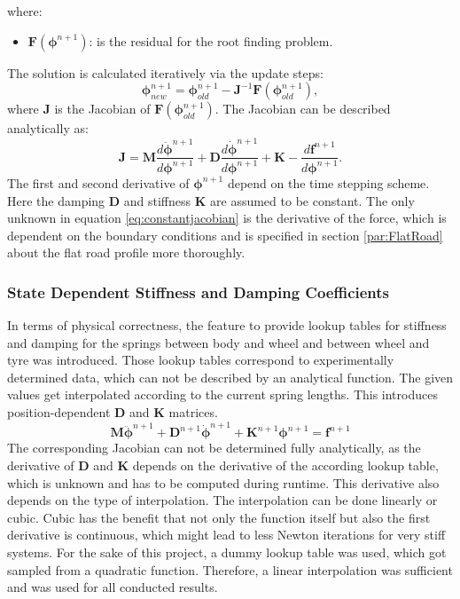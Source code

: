 where:
\begin{itemize}
    \item $\boldsymbol{F}(\boldsymbol{\phi}^{n+1})$: is the residual for the root finding problem.
\end{itemize}
The solution is calculated iteratively via the update steps:
\begin{equation}
\boldsymbol{\phi}^{n+1}_{new} = \boldsymbol{\phi}^{n+1}_{old} - \boldsymbol{J}^{-1}\boldsymbol{F}(\boldsymbol{\phi}^{n+1}_{old}),
\end{equation}
where $\boldsymbol{J}$ is the Jacobian of $\boldsymbol{F}(\boldsymbol{\phi}^{n+1}_{old})$. The Jacobian can be described analytically as:
\begin{equation}
    \label{eq:constantjacobian}
    \boldsymbol{J} = \boldsymbol{M} \frac{d \ddot{\boldsymbol{\phi}}^{n+1}}{d \boldsymbol{\phi}^{n+1}} +  \boldsymbol{D} \frac{d \dot{\boldsymbol{\phi}}^{n+1}}{d \boldsymbol{\phi}^{n+1}} + \boldsymbol{K}  - \frac{d \boldsymbol{f}^{n+1}}{d \boldsymbol{\phi}^{n+1}}.
\end{equation}
The first and second derivative of $\boldsymbol{\phi}^{n+1}$ depend on the time stepping scheme. Here the damping $\boldsymbol{D}$ and stiffness $\boldsymbol{K}$ are assumed to be constant. The only unknown in equation \eqref{eq:constantjacobian} is the derivative of the force, which is dependent on the boundary conditions and is specified in section \ref{par:FlatRoad} about the flat road profile more thoroughly.

\subsubsection{State Dependent Stiffness and Damping Coefficients}
In terms of physical correctness, the feature to provide lookup tables for stiffness and damping for the springs between body and wheel and between wheel and tyre was introduced. Those lookup tables correspond to experimentally determined data, which can not be described by an analytical function. The given values get interpolated according to the current spring lengths. This introduces position-dependent $\boldsymbol{D}$ and $\boldsymbol{K}$ matrices.
\begin{equation}
     \boldsymbol{M} \ddot{\boldsymbol{\phi}}^{n+1}+ \boldsymbol{D}^{n+1} \dot{\boldsymbol{\phi}}^{n+1} + \boldsymbol{K}^{n+1}\boldsymbol{\phi}^{n+1}=\boldsymbol{f}^{n+1}
\end{equation}
The corresponding Jacobian can not be determined fully analytically, as the derivative of $\boldsymbol{D}$ and $\boldsymbol{K}$ depends on the derivative of the according lookup table, which is unknown and has to be computed during runtime. This derivative also depends on the type of interpolation. The interpolation can be done linearly or cubic. Cubic has the benefit that not only the function itself but also the first derivative is continuous, which might lead to less Newton iterations for very stiff systems. For the sake of this project, a dummy lookup table was used, which got sampled from a quadratic function. Therefore, a linear interpolation was sufficient and was used for all conducted results.

